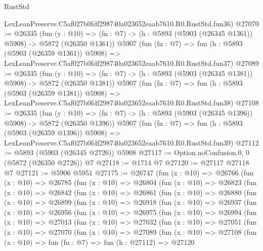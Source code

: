 \begin{lexlean}{RustStd}
\begin{coremodule}
    LexLeanPreserve.C5af027b0fdf298740a023652eaab7610.R0.RustStd.fun36)
@27070 := @26335
    (fun (y : @10) => (fn : @7) -> (h : @5893 (@5903 (@26345 @1361)) @5908) -> @5872 (@26350 @1361))
    @5907
    (fun (fn : @7) =>
    fun (h : @5893 (@5903 (@26359 @1361)) @5908) =>
    LexLeanPreserve.C5af027b0fdf298740a023652eaab7610.R0.RustStd.fun37)
@27089 := @26335
    (fun (y : @10) => (fn : @7) -> (h : @5893 (@5903 (@26345 @1381)) @5908) -> @5872 (@26350 @1381))
    @5907
    (fun (fn : @7) =>
    fun (h : @5893 (@5903 (@26359 @1381)) @5908) =>
    LexLeanPreserve.C5af027b0fdf298740a023652eaab7610.R0.RustStd.fun38)
@27108 := @26335
    (fun (y : @10) => (fn : @7) -> (h : @5893 (@5903 (@26345 @1396)) @5908) -> @5872 (@26350 @1396))
    @5907
    (fun (fn : @7) =>
    fun (h : @5893 (@5903 (@26359 @1396)) @5908) =>
    LexLeanPreserve.C5af027b0fdf298740a023652eaab7610.R0.RustStd.fun39)
@27112 := @5893 (@5903 (@26345 @2726)) @5908
@27117 := Option.noConfusion.{0, 0} (@5872 (@26350 @2726)) @7
@27118 := @1714 @7
@27120 := @27117 @27118 @7
@27121 := @5906 @5951
@27175 := @26747
    (fun (x : @10) =>
    @26766
      (fun (x : @10) =>
      @26785
        (fun (x : @10) =>
        @26804
          (fun (x : @10) =>
          @26823
            (fun (x : @10) =>
            @26842
              (fun (x : @10) =>
              @26861
                (fun (x : @10) =>
                @26880
                  (fun (x : @10) =>
                  @26899
                    (fun (x : @10) =>
                    @26918
                      (fun (x : @10) =>
                      @26937
                        (fun (x : @10) =>
                        @26956
                          (fun (x : @10) =>
                          @26975
                            (fun (x : @10) =>
                            @26994
                              (fun (x : @10) =>
                              @27013
                                (fun (x : @10) =>
                                @27032
                                  (fun (x : @10) =>
                                  @27051
                                    (fun (x : @10) =>
                                    @27070
                                      (fun (x : @10) =>
                                      @27089
                                        (fun (x : @10) =>
                                        @27108
                                          (fun (x : @10) =>
                                          fun (fn : @7) =>
                                          fun (h : @27112) =>
                                          @27120

\end{coremodule}
\end{lexlean}
